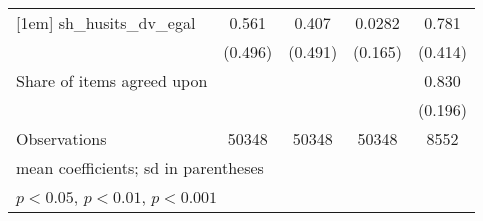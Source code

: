 {\begin{tabular}{l*{4}{c}}
[1em]
sh\_husits\_dv\_egal   &       0.561         &       0.407         &      0.0282         &       0.781         \\
                    &     (0.496)         &     (0.491)         &     (0.165)         &     (0.414)         \\
[1em]
Share of items agreed upon&                     &                     &                     &       0.830         \\
                    &                     &                     &                     &     (0.196)         \\
\hline
Observations        &       50348         &       50348         &       50348         &        8552         \\
\hline\hline
\multicolumn{5}{l}{\footnotesize mean coefficients; sd in parentheses}\\
\multicolumn{5}{l}{\footnotesize \sym{*} \(p<0.05\), \sym{**} \(p<0.01\), \sym{***} \(p<0.001\)}\\
\end{tabular}
}
